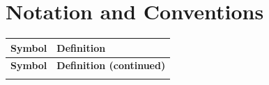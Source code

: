 \documentclass[10pt,a4paper,openany,twocolumn]{book}
\theoremstyle{definition}
\theoremstyle{remark}
\begin{document}
\normalsize
\bigskip

\tableofcontents

\listoffigures

\chapter*{Notation and Conventions}

\begin{longtable}{l p{10cm}}
\toprule
\textbf{Symbol} & \textbf{Definition} \\
\midrule
\endfirsthead
\toprule
\textbf{Symbol} & \textbf{Definition (continued)} \\
\midrule
\endhead
\bottomrule
\endfoot


\end{longtable}
\end{document}
